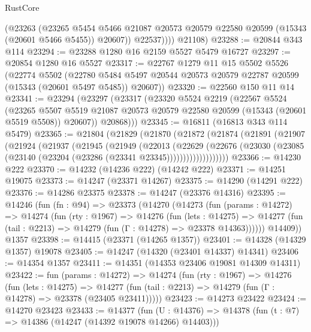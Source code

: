\begin{lexlean}{RustCore}
\begin{coremodule}
              (@23263
                (@23265
                  @5454
                  @5466
                  @21087
                  @20573
                  @20579
                  @22580
                  @20599
                  (@15343 (@20601 @5466 @5455))
                  @20607))
              @22537))))
      @21108)
@23288 := @20844 @343 @114
@23294 := @23288 @1280 @16 @2159 @5527 @5479 @16727
@23297 := @20854 @1280 @16 @5527
@23317 := @22767
    @1279
    @11
    @15
    @5502
    @5526
    (@22774
      @5502
      (@22780 @5484 @5497 @20544 @20573 @20579 @22787 @20599 (@15343 (@20601 @5497 @5485)) @20607))
@23320 := @22560 @150 @11 @14
@23341 := @23294
    (@23297
      (@23317
        (@23320
          @5524
          @2219
          (@22567
            @5524
            (@23265
              @5507
              @5519
              @21087
              @20573
              @20579
              @22580
              @20599
              (@15343 (@20601 @5519 @5508))
              @20607))
          @20868)))
@23345 := @16811 (@16813 @343 @114 @5479)
@23365 := @21804
    (@21829
      (@21870
        (@21872
          (@21874
            (@21891
              (@21907
                (@21924
                  (@21937
                    (@21945
                      (@21949
                        (@22013
                          (@22629
                            (@22676
                              (@23030
                                (@23085 (@23140 (@23204 (@23286 (@23341 @23345)))))))))))))))))))
@23366 := @14230 @222
@23370 := @14232 (@14236 @222) (@14242 @222)
@23371 := @14251 @19075
@23373 := @14247 (@23371 @14267)
@23375 := @14290 (@14291 @222)
@23376 := @14286 @23375
@23378 := @14247 (@23376 @14316)
@23395 := @14246
    (fun (fn : @94) =>
    @23373
      (@14270
        (@14273
          (fun (params : @14272) =>
          @14274
            (fun (rty : @1967) =>
            @14276
              (fun (lets : @14275) =>
              @14277 (fun (tail : @2213) => @14279 (fun (Γ : @14278) => @23378 @14363))))))
        @14409))
    @1357
@23398 := @14415 (@23371 (@14265 @1357))
@23401 := @14328 (@14329 @1357) @19078
@23405 := @14247 (@14320 (@23401 @14337) @14341)
@23406 := @14354 @1357
@23411 := @14351 (@14353 @23406 @19081 @14309 @14311)
@23422 := fun (params : @14272) =>
  @14274
    (fun (rty : @1967) =>
    @14276
      (fun (lets : @14275) =>
      @14277 (fun (tail : @2213) => @14279 (fun (Γ : @14278) => @23378 (@23405 @23411)))))
@23423 := @14273 @23422
@23424 := @14270 @23423
@23433 := @14377
    (fun (U : @14376) => @14378 (fun (t : @7) => @14386 (@14247 (@14392 @19078 @14266) @14403)))

\end{coremodule}
\end{lexlean}
